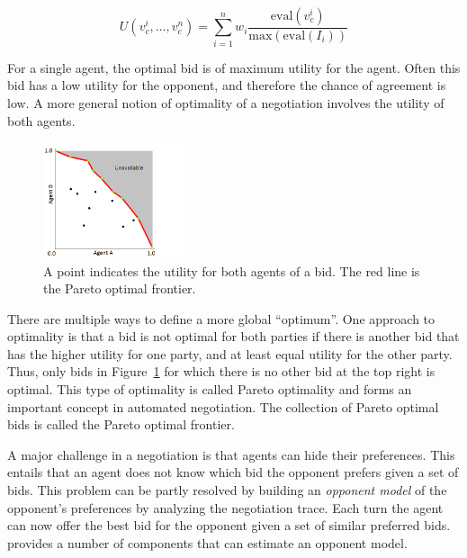 \documentclass[]{article}
\begin{document}
\begin{equation}
	U(v^i_{c},\ldots,v^n_{c}) = \sum_{i=1}^{n} w_i \dfrac{\text{eval}(v^i_{c})}{\text{max}(\text{eval}(I_i))}
	\label{eqn:Utility}
\end{equation}

\pagebreak

For a single agent, the optimal bid is of maximum utility for the agent. Often this bid has a low utility for the opponent, and therefore the chance of agreement is low. A more general notion of optimality of a negotiation involves the utility of both agents.
\begin{figure}[htb]
	\centering
	\includegraphics[width=0.37\textwidth]{media/image5.png}
\caption{A point indicates the utility for both agents of a bid. The red line is the Pareto optimal frontier.}\label{Fig:utility plot}
\end{figure}

There are multiple ways to define a more global ``optimum''. One approach to optimality is that a bid is not optimal for both parties if there is another bid that has the higher utility for one party, and at least equal utility for the other party. Thus, only bids in Figure~\ref{Fig:utility plot} for which there is no other bid at the top right is optimal. This type of optimality is called Pareto optimality and forms an important concept in automated negotiation. The collection of Pareto optimal bids is called the Pareto optimal frontier.

A major challenge in a negotiation is that agents can hide their preferences. This entails that an agent does not know which bid the opponent prefers given a set of bids. This problem can be partly resolved by building an \textit{opponent model} of the opponent's preferences by analyzing the negotiation trace. Each turn the agent can now offer the best bid for the opponent given a set of similar preferred bids. \Genius  provides a number of components that can estimate an opponent model.
\end{document}
